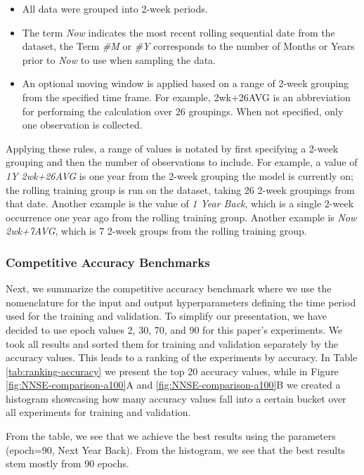 \documentclass[utf8]{FrontiersinVancouver} %
\begin{document}
\begin{itemize}
  \item All data were grouped into 2-week periods.
  \item The term {\em Now} indicates the most recent rolling sequential date from the dataset, the Term {\em \#M} or {\em \#Y}    corresponds to the number of Months or Years prior to {\em Now} to use when sampling the data.
  \item An optional moving window is applied based on a range of    2-week grouping from the specified time frame.  For example,    2wk+26AVG is an abbreviation for performing the calculation over    26 groupings.  When not specified, only one observation is collected.
\end{itemize}



Applying these rules, a range of values is notated by first specifying a 2-week grouping and then the number of observations to include. For example, a value of {\em 1Y 2wk+26AVG} is one year from the 2-week grouping the model is currently on; the rolling training group is run on the dataset, taking 26 2-week groupings from that date. Another example is the value of {\em 1 Year Back}, which is a single 2-week occurrence one year ago from the rolling training group. Another example is {\em Now 2wk+7AVG}, which is 7 2-week groups from the rolling training group.


\subsubsection{Competitive Accuracy Benchmarks}

Next, we summarize the competitive accuracy benchmark where we use the nomenclature for the input and output hyperparameters defining the time period used for the training and validation.  To simplify our presentation, we have decided to use epoch values 2, 30, 70, and 90 for this paper's experiments. We took all results and sorted them for training and validation separately by the accuracy values. This leads to a ranking of the experiments by accuracy. In Table \ref{tab:ranking-accuracy} we present the top 20 accuracy values, while in Figure \ref{fig:NNSE-comparison-a100}A and \ref{fig:NNSE-comparison-a100}B we created a histogram showcasing how many accuracy values fall into a certain bucket over all experiments for training and validation.

From the table, we see that we achieve the best results using the parameters (epoch=90, Next Year Back). From the histogram, we see that the best results stem mostly from 90 epochs.
\end{document}
